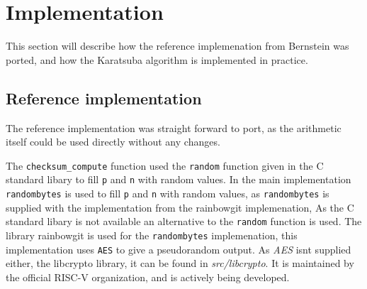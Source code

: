 \section{Implementation}


This section will describe how the reference implemenation from Bernstein was ported, and how the Karatsuba algorithm is implemented in practice.
\subsection{Reference implementation}
The reference implementation was straight forward to port, as the arithmetic itself could be used directly without any changes.


The \texttt{checksum\_compute} function used the \texttt{random\(\)} function given in the C standard libary to fill \texttt{p} and \texttt{n} with random values. In the main implementation \texttt{randombytes\(\)} is used to fill \texttt{p} and \texttt{n} with random values, as \texttt{randombytes\(\)} is supplied with the implementation from the rainbowgit implemenation\cite{rainbowgit}, 
As the C standard libary is not available an alternative to the \texttt{random\(\)} function is used. The library rainbowgit\cite{rainbowgit} is used for the \texttt{randombytes\(\)} implemenation, this implementation uses \texttt{AES} to give a pseudorandom output. As \textit{AES} isnt supplied either, the libcrypto library\cite{libcrypto}, it can be found in \textit{src/libcrypto}. It is maintained by the official RISC-V organization, and is actively being developed.



